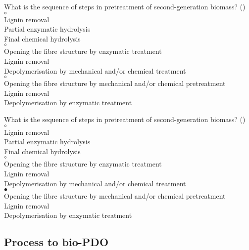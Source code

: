 \documentclass[]{beamer}
\begin{document}
\begin{CJK}{UTF8}{gbsn}
\begin{frame}[shrink] {}
\addtocounter{questions}{1}
\color{blue}
What is the sequence of steps in pretreatment of second-generation biomass?
({})\\
\color{black}
\setlength{\parindent}{-0.4cm}
{\color{red}$\circ$}    \\
Lignin removal\\
Partial enzymatic hydrolysis\\
Final chemical hydrolysis\\
{\color{red}$\circ$}    \\
Opening the fibre structure by enzymatic treatment \\
Lignin removal\\
Depolymerisation by mechanical and/or chemical treatment\\
{\color{red}$\circ$}    \\
Opening the fibre structure by mechanical and/or chemical pretreatment\\
Lignin removal\\
Depolymerisation by enzymatic treatment\\
\end{frame}
\begin{frame}[shrink] {}
\addtocounter{answers}{1}
\color{blue}
What is the sequence of steps in pretreatment of second-generation biomass?
({})\\
\color{black}
\setlength{\parindent}{-0.4cm}
{\color{red}$\circ$}    \\
Lignin removal\\
Partial enzymatic hydrolysis\\
Final chemical hydrolysis\\
{\color{red}$\circ$}    \\
Opening the fibre structure by enzymatic treatment \\
Lignin removal\\
Depolymerisation by mechanical and/or chemical treatment\\
{\color{red}$\bullet$}   \\
Opening the fibre structure by mechanical and/or chemical pretreatment\\
Lignin removal\\
Depolymerisation by enzymatic treatment\\
\end{frame}

\subsection{Process to bio-PDO}
\setcounter{questions}{0}
\setcounter{answers}{0}



\end{CJK}
\end{document}
